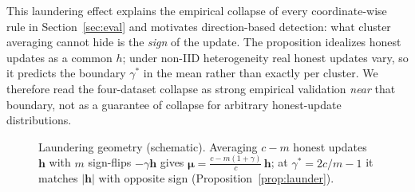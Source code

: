 \documentclass[lettersize,journal]{IEEEtran}
\begin{document}
This laundering effect explains the empirical collapse of every coordinate-wise
rule in Section~\ref{sec:eval} and motivates direction-based detection: what
cluster averaging cannot hide is the \emph{sign} of the update. The proposition
idealizes honest updates as a common $h$; under non-IID heterogeneity real honest
updates vary, so it predicts the boundary $\gamma^{*}$ in the mean rather than
exactly per cluster. We therefore read the four-dataset collapse as strong
empirical validation \emph{near} that boundary, not as a guarantee of collapse for
arbitrary honest-update distributions.

\begin{figure}[tbp]
\centering
{}
\caption{Laundering geometry (schematic). Averaging $c{-}m$ honest updates
$\mathbf{h}$ with $m$ sign-flips $-\gamma\mathbf{h}$ gives
$\boldsymbol{\mu}=\tfrac{c-m(1+\gamma)}{c}\,\mathbf{h}$; at $\gamma^{\!*}{=}2c/m-1$ it
matches $|\mathbf{h}|$ with opposite sign (Proposition~\ref{prop:launder}).}
\label{fig:launder-geom}
\end{figure}
\end{document}

